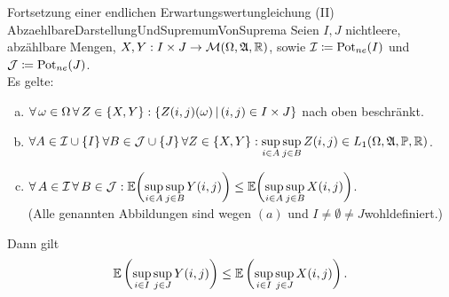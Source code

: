 \begin{satz}{Fortsetzung einer endlichen Erwartungswertungleichung (II)}
            {AbzaehlbareDarstellungUndSupremumVonSuprema}
Seien $I, J$ nichtleere, abzählbare Mengen,
$X, Y: I\times J \rightarrow \mathcal{M}(\Omega, \mathfrak{A}, \mathbb{R})$, sowie
$\mathcal{I} \coloneqq  \mathop{\textrm{Pot}}\nolimits_{ne}(I)$ und $\mathcal{J} \coloneqq  \mathop{\textrm{Pot}}\nolimits_{ne}(J)$.\\
Es gelte:
\begin{enumerate}[(a)]
\item $\forall\,\omega\in\Omega\,\forall\, Z\in \left\{X, Y\right\}: 
\left\{Z(i, j)(\omega)\,|\,(i, j)\in I\times J\right\}$
      nach oben beschränkt.
\item $\forall A \in \mathcal{I} \cup \left\{I\right\} \forall B \in \mathcal{J} \cup \left\{J\right\}
\forall Z\in \left\{X, Y\right\}:
     \underset{i \in A}\sup\,\underset{j \in B}\sup\, Z(i, j)
     \in L_1(\Omega, \mathfrak{A}, \mathbb{P}, \mathbb{R})$.
\item $\forall\, A \in \mathcal{I} \, \forall\, B \in \mathcal{J}: 
\mathbb{E}\bigg(\underset{i \in A}\sup\,\underset{j \in B}\sup\, Y(i, j) \bigg)
\le \mathbb{E}\bigg(\underset{i \in A}\sup\,\underset{j \in B}\sup\, X(i, j) \bigg)$.\\
 (Alle genannten Abbildungen sind wegen $(a)$ und
$I \neq \emptyset \neq J$wohldefiniert.)
\end{enumerate}
Dann gilt
\[\mathbb{E}\left(\sup_{i \in I}\sup_{j \in J}Y(i, j) \right) \le
  \mathbb{E}\left(\sup_{i \in I}\sup_{j \in J}X(i, j) \right)\text.\]
\end{satz}
